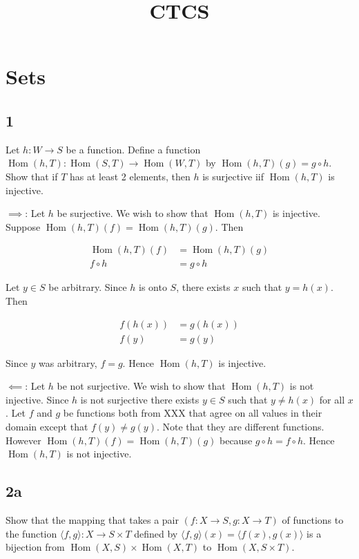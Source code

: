 \documentclass{article}
\title{CTCS}
\date{}
\DeclareMathOperator{\Hom}{Hom}
\newcommand{\<}{\langle}
\renewcommand{\>}{\rangle}
\begin{document}
\maketitle


\section*{Sets}

\subsection*{1}

Let $h: W \rightarrow S$ be a function. Define a function $\Hom(h, T): \Hom(S, T) \to \Hom(W, T)$ by $\Hom(h, T)(g) = g \circ h$. Show that if $T$ has at least 2 elements, then $h$ is surjective iif $\Hom(h, T)$ is injective.

$\implies$: Let $h$ be surjective. We wish to show that $\Hom(h, T)$ is injective. Suppose $\Hom(h, T)(f) = \Hom(h, T)(g)$. Then

\begin{align}
\Hom(h, T)(f) &= \Hom(h, T)(g) \\
f \circ h &= g \circ h
\end{align}

Let $y \in S$ be arbitrary. Since $h$ is onto $S$, there exists $x$ such that $y = h(x)$. Then

\begin{align}
f(h(x)) &= g(h(x)) \\
f(y) &= g(y)
\end{align}

Since $y$ was arbitrary, $f = g$. Hence $\Hom(h, T)$ is injective.

$\impliedby$: Let $h$ be not surjective. We wish to show that $\Hom(h, T)$ is not injective. Since $h$ is not surjective there exists $y \in S$ such that $y \ne h(x)$ for all $x$. Let $f$ and $g$ be functions both from XXX that agree on all values in their domain except that $f(y) \ne g(y)$. Note that they are different functions. However $\Hom(h, T)(f) = \Hom(h, T)(g)$ because $g \circ h = f \circ h$. Hence $\Hom(h, T)$ is not injective.

\subsection*{2a}

Show that the mapping that takes a pair $(f: X \to S, g: X \to T)$ of functions to the function $\<f, g\>: X \to S \times T$ defined by $\<f, g\>(x) = \<f(x), g(x)\>$ is a bijection from $\Hom(X, S) \times \Hom(X, T)$ to $\Hom(X, S \times T)$.
\end{document}
